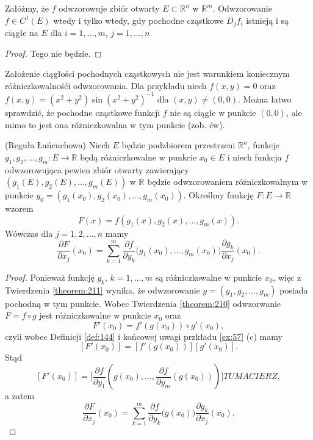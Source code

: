 \documentclass[leqno]{article}
\begin{document}
\begin{justify}
\begin{theorem}
    Załóżmy, że $f$ odwzorowuje zbiór otwarty $E \subset \mathbb{R}^n$ w $\mathbb{R}^m$. Odwzorowanie $f \in C^1(E)$ wtedy i tylko wtedy, gdy pochodne 
    cząstkowe $D_j f_i$ istnieją i są ciągłe na $E$ dla $i = 1, \ldots, m$, $j = 1, \ldots, n$.
\end{theorem}

\begin{proof}
    Tego nie będzie.
\end{proof}

\begin{uwaga}
    Założenie ciągłości pochodnych cząstkowych nie jest warunkiem koniecznym różniczkowalnośći odwzorowania. Dla przykładu niech
    $f(x,y) = 0$ oraz $f(x,y) = (x^2+y^2)\sin(x^2 + y^2)^{-1}$ dla $(x,y) \neq (0,0)$. Można łatwo sprawdzić, że pochodne cząstkowe funkcji $f$
    nie są ciągłe w punkcie $(0,0)$, ale mimo to jest ona różniczkowalna w tym punkcie (zob. ćw).
\end{uwaga}

\begin{theorem}
{
    (Reguła Łańcuchowa) Niech $E$ będzie podzbiorem przestrzeni $\mathbb{R}^n$, funkcje $g_1, g_2, \ldots, g_m : E \to \mathbb{R}$ będą różniczkowalne w punkcie $x_0 \in E$
    i niech funkcja $f$ odwzorowująca pewien zbiór otwarty zawierający $(g_1(E), g_2(E), \ldots, g_m(E))$ w $\mathbb{R}$ będzie odwzorowaniem różniczkowalnym w punkcie $y_0 = 
    (g_1(x_0), g_2(x_0), \ldots, g_m(x_0))$. Określmy funkcję $F : E \to \mathbb{R}$ wzorem
    \[
        F(x) = f(g_1(x), g_2(x), \ldots, g_m(x)).
    \]
    Wówczas dla $j = 1, 2, \ldots, n$ mamy 
    \[
        \frac{\partial F}{\partial x_j}(x_0) = \sum_{k=1}^{m}\frac{\partial f}{\partial y_k}\Big(g_1(x_0), \ldots, g_m(x_0)\Big)\frac{\partial g_k}{\partial x_j}(x_0).
    \]
}
\end{theorem}

\begin{proof}
    Ponieważ funkcję $g_k$, $k = 1, \ldots, m$ są różniczkowalne w punkcie $x_0$, więc z Twierdzenia \ref{theorem:211} wynika, że odwzorowanie $g = (g_1, g_2, \ldots, g_m)$
    posiada pochodną w tym punkcie. Wobec Twierdzenia \ref{theorem:210} odwzorwanie $F = f \circ g$ jest różniczkowalne w punkcie $x_0$ oraz 
    \[
        F'(x_0) = f'(g(x_0)) \circ g'(x_0),
    \]
    czyli wobec Definicji \ref{def:144} i końcowej uwagi przkładu \ref{ex:57} (c) mamy
    \[
        [F'(x_0)] = [f'(g(x_0))] [g'(x_0)].
    \]
    Stąd
    \[
        [F'(x_0)] = \Big[\frac{\partial f}{\partial y_1}(g(x_0), \ldots, \frac{\partial f}{\partial y_m}(g(x_0)))\Big] TU MACIERZ,
    \]
    a zatem
    \[
        \frac{\partial F}{\partial x_j}(x_0) = \sum_{k=1}^{m}\frac{\partial f}{\partial y_k}\Big(g(x_0)\Big)\frac{\partial g_k}{\partial x_j}(x_0).
    \]


\end{proof}
\end{justify}
\end{document}

